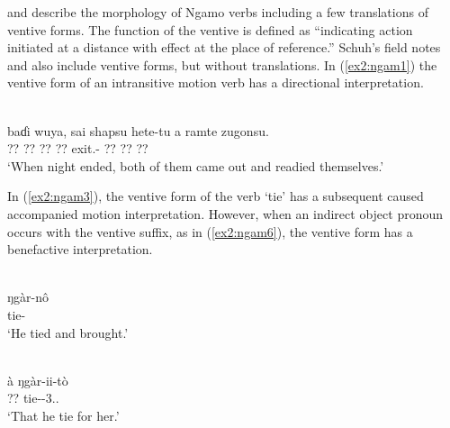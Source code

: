 \citet{schuhDegeminationCompensatoryLengthening2005} and \citet[332--353]{schuhChadicCornucopia2017} describe the morphology of Ngamo verbs including a few translations of ventive forms. The function of the ventive is defined as ``indicating action initiated at a distance with effect at the place of reference.'' Schuh’s \citeyearpar{schuhNgamoVerbalSystem2004,schuhGudiNgamoVerb2010} field notes and \citet{ibriszimowVerbNgamo2006} also include ventive forms, but without translations. In (\ref{ex2:ngam1}) the ventive form of an intransitive motion verb has a directional interpretation. 

\ea\label{ex2:ngam1}
 \\
\gll baɗi wuya, sai shapsu hete-tu a ramte zugonsu.	 \\
?? ?? ?? ?? exit.- ?? ?? ??		\\
\glt `When night ended, both of them came out and readied themselves.'
\z 


\newpage
In (\ref{ex2:ngam3}), the ventive form of the verb `tie' has a subsequent caused accompanied motion interpretation. However, when an indirect object pronoun occurs with the ventive suffix, as in (\ref{ex2:ngam6}), the ventive form has a benefactive interpretation.

\ea\label{ex2:ngam3}
 \\
\gll ŋgàr-nô \\
tie- \\
\glt `He tied and brought.'

\ex\label{ex2:ngam6}
 \\
\gll à ŋgàr-ii-tò \\
?? tie--3..	\\
\glt `That he tie for her.'
\z 

